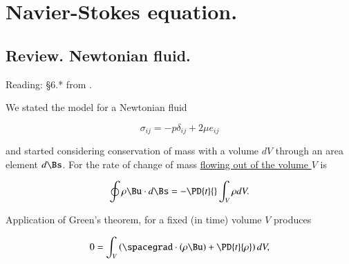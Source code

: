 %
%

\chapter{Navier-Stokes equation.}
\label{chap:continuumL10}
{}
\date{Feb 10, 2012}

\beginArtWithToc

%

\section{Review.  Newtonian fluid.}

Reading: \S 6.* from \cite{acheson1990elementary}.

We stated the model for a Newtonian fluid

\begin{equation}\label{eqn:continuumL10:10}
\sigma_{ij} = -p \delta_{ij} + 2 \mu e_{ij}
\end{equation}

and started considering conservation of mass with a volume $dV$ through an area element $d\Bs$.  For the rate of change of mass \underline{flowing out of the volume $V$} is 

\begin{equation}\label{eqn:continuumL10:30}
\oint \rho \Bu \cdot d\Bs = - \PD{t}{} \int_V \rho dV.
\end{equation}

Application of Green's theorem, for a fixed (in time) volume $V$ produces

\begin{equation}\label{eqn:continuumL10:50}
0 = \int_V \left( \spacegrad \cdot (\rho \Bu) + \PD{t}{\rho} \right) dV,
\end{equation}

